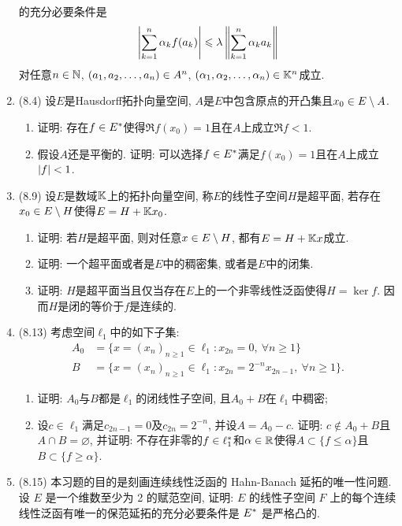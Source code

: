\begin{enumerate}[label=\textbf{\arabic*.}, ref=\arabic*]
	      的充分必要条件是
	      \[
		      \left| \sum_{k=1}^n\alpha_kf(a_k) \right| \leqslant\lambda\left\| \sum_{k=1}^n\alpha_ka_k \right\|
	      \]
	      对任意$ n\in\mathbb{N} $, $ (a_{1}, a_{2}, \dots, a_{n})\in A^n $, $ (\alpha_{1}, \alpha_{2}, \dots, \alpha_{n})\in\mathbb{K}^n $成立.
	\item (8.4) 设$ E $是Hausdorff拓扑向量空间, $ A $是$ E $中包含原点的开凸集且$ x_0\in E\setminus A $.
	      \begin{enumerate}[(1)]
		      \item 证明: 存在$ f\in E^{*} $使得$ \Re f(x_0)=1 $且在$ A $上成立$ \Re f<1 $.
		      \item 假设$ A $还是平衡的. 证明: 可以选择$ f\in E^{*} $满足$ f(x_0)=1 $且在$ A $上成立$ \left| f \right| <1 $.
	      \end{enumerate}
	\item (8.9) 设$ E $是数域$ \mathbb{K} $上的拓扑向量空间, 称$ E $的线性子空间$ H $是超平面, 若存在$ x_0\in E\setminus H $使得$ E=H+\mathbb{K} x_0 $.
	      \begin{enumerate}[(1)]
		      \item 证明: 若$ H $是超平面, 则对任意$ x\in E\setminus H $, 都有$ E=H+\mathbb{K} x $成立.
		      \item 证明: 一个超平面或者是$ E $中的稠密集, 或者是$ E $中的闭集.
		      \item 证明: $ H $是超平面当且仅当存在$ E $上的一个非零线性泛函使得$ H=\ker f $. 因而$ H $是闭的等价于$ f $是连续的.
	      \end{enumerate}
	\item (8.13) 考虑空间$ \ell_1 $中的如下子集:
	      \[
		      \begin{aligned}
			      A_0 & =\{ x=(x_n)_{n\geqslant 1}\in\ell_1 : x_{2n}=0,\ \forall n\geqslant 1 \}               \\
			      B   & =\{ x=(x_n)_{n\geqslant 1}\in\ell_1 : x_{2n}=2^{-n}x_{2n-1},\ \forall n\geqslant 1 \}.
		      \end{aligned}
	      \]
	      \begin{enumerate}[(1)]
		      \item 证明: $ A_0 $与$ B $都是$ \ell_1 $的闭线性子空间, 且$ A_0+B $在$\ell_1 $中稠密;
		      \item 设$ c\in\ell_1 $满足$ c_{2n-1}=0 $及$ c_{2n}=2^{-n} $, 并设$ A=A_0-c $. 证明: $ c\notin A_0+B $且$ A\cap B=\varnothing $, 并证明: 不存在非零的$ f\in\ell_1^{*} $和$ \alpha\in\mathbb{R} $使得$ A\subset\{ f\leqslant\alpha \} $且$ B\subset\{ f\geqslant\alpha \} $.
	      \end{enumerate}
	\item (8.15) 本习题的目的是刻画连续线性泛函的 Hahn-Banach 延拓的唯一性问题. 设 $ E $ 是一个维数至少为 2 的赋范空间, 证明: $ E $ 的线性子空间 $ F $ 上的每个连续线性泛函有唯一的保范延拓的充分必要条件是 $ E^{*} $ 是严格凸的.

\end{enumerate}

